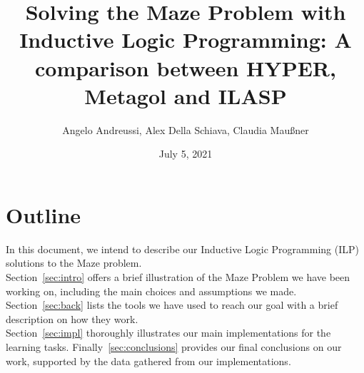 \documentclass[12pt,table]{article}
\title{Solving the Maze Problem with Inductive Logic Programming: A comparison between HYPER, Metagol and ILASP}
\author{Angelo Andreussi, Alex Della Schiava, Claudia Mau\ss ner}
\date{July 5, 2021}
\begin{document}
\maketitle

\section{Outline}
In this document, we intend to describe our Inductive Logic Programming (ILP) solutions to the Maze problem.\\
Section~\ref{sec:intro} offers a brief illustration of the Maze Problem we have been working on,
including the main choices and assumptions we made.\\
Section~\ref{sec:back} lists the tools we have used to reach our goal with a brief description on how they work.\\
Section~\ref{sec:impl} thoroughly illustrates our main implementations for the learning tasks.
Finally~\ref{sec:conclusions} provides our final conclusions on our work, supported by the data gathered from our implementations.








\end{document}
